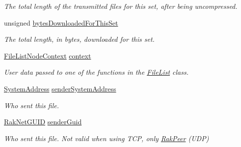 \begin{DoxyCompactItemize}
\begin{DoxyCompactList}\small\item\em The total length of the transmitted files for this set, after being uncompressed. \end{DoxyCompactList}\item 
\hypertarget{struct_rak_net_1_1_file_list_transfer_c_b_interface_1_1_on_file_struct_a964493d4d13c1dc60945e6008d12970c}{unsigned \hyperlink{struct_rak_net_1_1_file_list_transfer_c_b_interface_1_1_on_file_struct_a964493d4d13c1dc60945e6008d12970c}{bytes\-Downloaded\-For\-This\-Set}}\label{struct_rak_net_1_1_file_list_transfer_c_b_interface_1_1_on_file_struct_a964493d4d13c1dc60945e6008d12970c}

\begin{DoxyCompactList}\small\item\em The total length, in bytes, downloaded for this set. \end{DoxyCompactList}\item 
\hyperlink{struct_file_list_node_context}{File\-List\-Node\-Context} \hyperlink{struct_rak_net_1_1_file_list_transfer_c_b_interface_1_1_on_file_struct_ad9134e6310c8a685a6db27de4d81b32e}{context}
\begin{DoxyCompactList}\small\item\em User data passed to one of the functions in the \hyperlink{class_rak_net_1_1_file_list}{File\-List} class. \end{DoxyCompactList}\item 
\hypertarget{struct_rak_net_1_1_file_list_transfer_c_b_interface_1_1_on_file_struct_ad16e5bd930e0a9a5e09c4f9efd4899dd}{\hyperlink{struct_rak_net_1_1_system_address}{System\-Address} \hyperlink{struct_rak_net_1_1_file_list_transfer_c_b_interface_1_1_on_file_struct_ad16e5bd930e0a9a5e09c4f9efd4899dd}{sender\-System\-Address}}\label{struct_rak_net_1_1_file_list_transfer_c_b_interface_1_1_on_file_struct_ad16e5bd930e0a9a5e09c4f9efd4899dd}

\begin{DoxyCompactList}\small\item\em Who sent this file. \end{DoxyCompactList}\item 
\hypertarget{struct_rak_net_1_1_file_list_transfer_c_b_interface_1_1_on_file_struct_a26eb022c51ff5cea4779be0637343667}{\hyperlink{struct_rak_net_1_1_rak_net_g_u_i_d}{Rak\-Net\-G\-U\-I\-D} \hyperlink{struct_rak_net_1_1_file_list_transfer_c_b_interface_1_1_on_file_struct_a26eb022c51ff5cea4779be0637343667}{sender\-Guid}}\label{struct_rak_net_1_1_file_list_transfer_c_b_interface_1_1_on_file_struct_a26eb022c51ff5cea4779be0637343667}

\begin{DoxyCompactList}\small\item\em Who sent this file. Not valid when using T\-C\-P, only \hyperlink{class_rak_net_1_1_rak_peer}{Rak\-Peer} (U\-D\-P) \end{DoxyCompactList}\end{DoxyCompactItemize}


